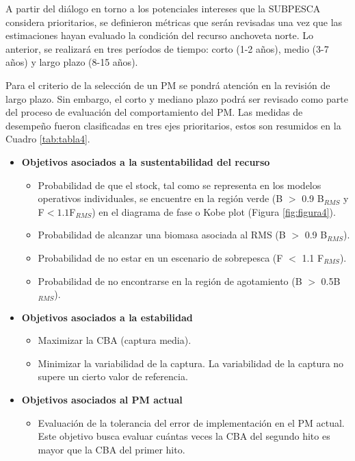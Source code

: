 
A partir del diálogo en torno a los potenciales intereses que la SUBPESCA considera prioritarios, se definieron métricas que serán revisadas una vez que las estimaciones hayan evaluado la condición del recurso anchoveta norte. Lo anterior, se realizará en tres períodos de tiempo: corto (1-2 años), medio (3-7 años) y largo plazo (8-15 años). 
\newline

Para el criterio de la selección de un PM se pondrá atención en la revisión de largo plazo. Sin embargo, el corto y mediano plazo podrá ser revisado como parte del proceso de evaluación del comportamiento del PM. Las medidas de desempeño fueron clasificadas en tres ejes prioritarios, estos son resumidos en la Cuadro \ref{tab:tabla4}.

\begin{itemize}
    \item \textbf{Objetivos asociados a la sustentabilidad del recurso}
    \begin{itemize}
        \item Probabilidad de que el stock, tal como se representa en los modelos operativos individuales, se encuentre en la región verde (B $>$ 0.9 B$_{RMS}$ y F$<1.1$F$_{RMS}$) en el diagrama de fase o Kobe plot (Figura \ref{fig:figura4}).
        \item Probabilidad de alcanzar una biomasa asociada al RMS (B $>$ 0.9 B$_{RMS}$).
        \item Probabilidad de no estar en un escenario de sobrepesca (F $<$ 1.1 F$_{RMS}$).
        \item Probabilidad de no encontrarse en la región de agotamiento (B $>$ 0.5B$_{RMS}$). 
    \end{itemize} 
    \item \textbf{Objetivos asociados a la estabilidad}
    \begin{itemize}
        \item Maximizar la CBA (captura media).
        \item Minimizar la variabilidad de la captura. La variabilidad de la captura no supere un cierto valor de referencia. 
    \end{itemize}
    \item \textbf{Objetivos asociados al PM actual}
    \begin{itemize}
        \item Evaluación de la tolerancia del error de implementación en el PM actual. Este objetivo busca evaluar cuántas veces la CBA del segundo hito es mayor que la CBA del primer hito.
    \end{itemize}
\end{itemize}

